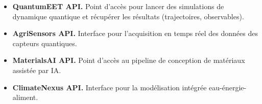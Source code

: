 \documentclass[12pt, a4paper]{article}
\begin{document}
\begin{itemize}
    \item \textbf{QuantumEET API.} Point d'accès pour lancer des simulations de dynamique quantique et récupérer les résultats (trajectoires, observables).
    \item \textbf{AgriSensors API.} Interface pour l'acquisition en temps réel des données des capteurs quantiques.
    \item \textbf{MaterialsAI API.} Point d'accès au pipeline de conception de matériaux assistée par IA.
    \item \textbf{ClimateNexus API.} Interface pour la modélisation intégrée eau-énergie-aliment.
\end{itemize}

\newpage


\end{document}
